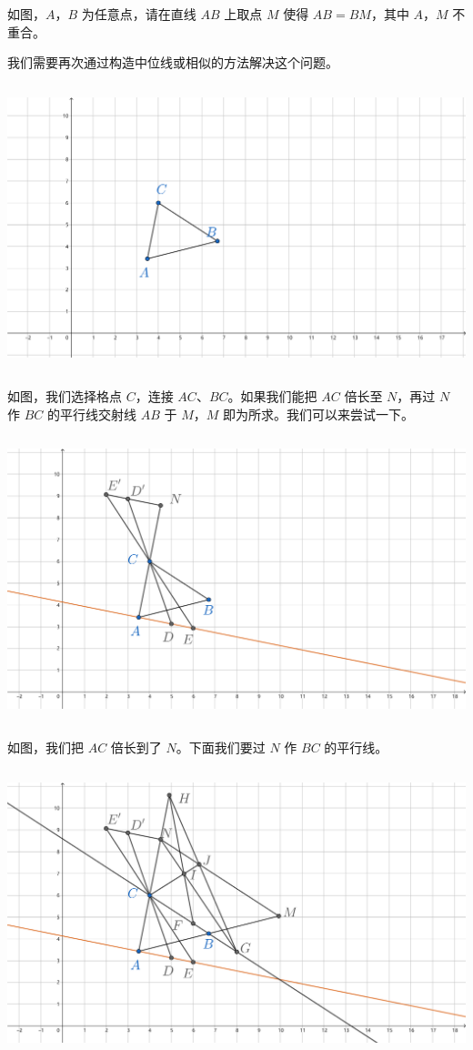 \documentclass[UTF8]{article}
\begin{document}
如图，\(A\)，\(B\) 为任意点，请在直线 \(AB\) 上取点 \(M\) 使得
\(AB = BM\)，其中 \(A\)，\(M\) 不重合。

我们需要再次通过构造中位线或相似的方法解决这个问题。

\includegraphics[width=5.76806in,height=3.27847in]{media/image40.png}

如图，我们选择格点 \(C\)，连接 \(AC\)、\(BC\)。如果我们能把 \(AC\)
倍长至 \(N\)，再过 \(N\) 作 \(BC\) 的平行线交射线 \(AB\) 于 \(M\)，\(M\)
即为所求。我们可以来尝试一下。

\includegraphics[width=5.76806in,height=3.27292in]{media/image41.png}

如图，我们把 \(AC\) 倍长到了 \(N\)。下面我们要过 \(N\) 作 \(BC\)
的平行线。

\includegraphics[width=5.76806in,height=3.27292in]{media/image42.png}
\end{document}
